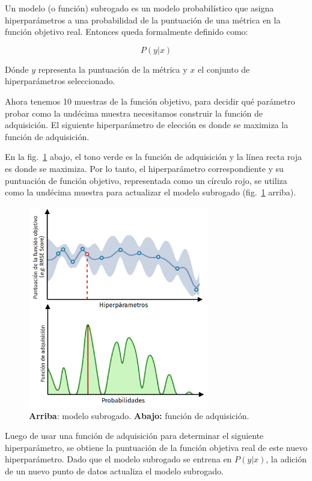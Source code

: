 \documentclass[a4paper,12pt]{article}
\begin{document}
Un modelo (o función) subrogado es un modelo probabilístico que asigna hiperparámetros a una probabilidad de la puntuación de una métrica en la función objetivo real. Entonces queda formalmente definido como:

$$ P(y|x) $$

Dónde $y$ representa la puntuación de la métrica y $x$ el conjunto de hiperparámetros seleccionado.

Ahora tenemos 10 muestras de la función objetivo, para decidir qué parámetro probar como la undécima muestra necesitamos construir la función de adquisición. El siguiente hiperparámetro de elección es donde se maximiza la función de adquisición.

En la fig.~\ref{fig:bayes9} abajo, el tono verde es la función de adquisición y la línea recta roja es donde se maximiza. Por lo tanto, el hiperparámetro correspondiente y su puntuación de función objetivo, representada como un círculo rojo, se utiliza como la undécima muestra para actualizar el modelo subrogado (fig.~\ref{fig:bayes9} arriba).

\begin{figure}[H]
	\begin{center}
		\includegraphics[width=0.7\textwidth]{bayes_opt_9_v2.png}
		\caption{\textbf{Arriba}: modelo subrogado. \textbf{Abajo:} función de adquisición.}
		\label{fig:bayes9}
	\end{center}
\end{figure}

Luego de usar una función de adquisición para determinar el siguiente hiperparámetro, se obtiene la puntuación de la función objetiva real de este nuevo hiperparámetro. Dado que el modelo subrogado se entrena en $P(y|x)$, la adición de un nuevo punto de datos actualiza el modelo subrogado.
\end{document}
